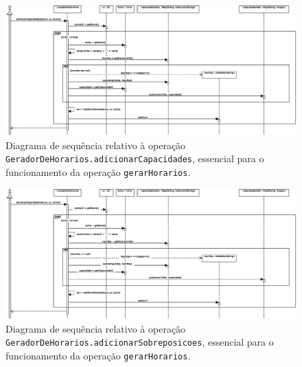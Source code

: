 \documentclass[12pt, a4paper]{article}
\begin{document}
\begin{landscape}
        \vspace*{\fill}
        \pagebreak
        \vspace*{\fill}

        \begin{figure}[H]
            \centering
            \includegraphics[scale=0.70]{Imagens/Modelos/gerarHorariosAdicionarCapacidadesDAO.svg.eps}
            \caption{
                Diagrama de sequência relativo à operação \texttt{GeradorDeHorarios.adicionarCapacidades},
                essencial para o funcionamento da operação \texttt{gerarHorarios}.
            }
        \end{figure}

        \vspace*{\fill}
        \pagebreak
        \vspace*{\fill}

        \begin{figure}[H]
            \centering
            \includegraphics[scale=0.70]{Imagens/Modelos/gerarHorariosAdicionarSobreposicoesDAO.svg.eps}
            \caption{
                Diagrama de sequência relativo à operação \texttt{GeradorDeHorarios.adicionarSobreposicoes},
                essencial para o funcionamento da operação \texttt{gerarHorarios}.
            }
        \end{figure}

        \vspace*{\fill}
        \pagebreak
        \vspace*{\fill}


\end{landscape}
\end{document}
